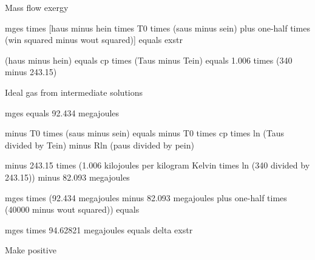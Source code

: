 Mass flow exergy  

mges times [haus minus hein times T0 times (saus minus sein) plus one-half times (win squared minus wout squared)] equals exstr  

(haus minus hein) equals cp times (Taus minus Tein) equals 1.006 times (340 minus 243.15)  

Ideal gas from intermediate solutions  

mges equals 92.434 megajoules  

minus T0 times (saus minus sein) equals minus T0 times cp times ln (Taus divided by Tein) minus Rln (paus divided by pein)  

minus 243.15 times (1.006 kilojoules per kilogram Kelvin times ln (340 divided by 243.15)) minus 82.093 megajoules  

mges times (92.434 megajoules minus 82.093 megajoules plus one-half times (40000 minus wout squared)) equals  

mges times {94.62821 megajoules} equals delta exstr  

Make positive